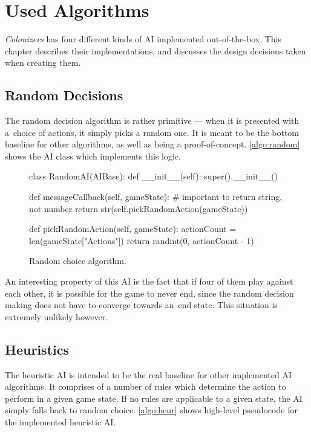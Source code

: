 \chapter{Used Algorithms}

\emph{Colonizers} has four different kinds of AI implemented out-of-the-box.
This chapter describes their implementations, and discusses the design decisions
taken when creating them.

\section{Random Decisions}

The random decision algorithm is rather primitive --- when it is presented with
a~choice of actions, it simply picks a random one. It is meant to be
the bottom baseline for other algorithms,
as well as being a proof-of-concept. \autoref{algo:random} shows the AI class which
implements this logic.

\begin{figure}[h!]
\begin{code}[commandchars=\\\{\},codes={\catcode`\$=3\catcode`\^=7\catcode`\_=8}]
class RandomAI(AIBase):
    def \_\_init\_\_(self):
        super().\_\_init\_\_()

    def messageCallback(self, gameState):
        # important to return string, not number
        return str(self.pickRandomAction(gameState))

    def pickRandomAction(self, gameState):
        actionCount = len(gameState["Actions"])
        return randint(0, actionCount - 1)
\end{code}
\caption{Random choice algorithm.}\label{algo:random}
\end{figure}

An interesting property of this AI is the fact that if four of them play
against each other, it is possible for the game to never end, since
the random decision making does not have to converge towards an~end state.
This situation is extremely unlikely however.

\section{Heuristics}
\label{sec:algoheur}

The heuristic AI is intended to be the real baseline for other implemented AI algorithms.
It comprises of a number of rules which determine the action to perform in a given
game state. If no rules are applicable to a given state, the AI simply
falls back to random choice. \autoref{algo:heur} shows high-level pseudocode for
the implemented heuristic AI.

